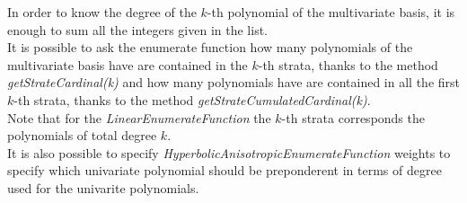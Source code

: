 In order to know the degree of the $k$-th polynomial of the multivariate basis, it is enough to sum all the integers given in the list.\\
It is possible to ask the enumerate function how many polynomials of the multivariate basis have are contained in the $k$-th strata, thanks to the method {\itshape getStrateCardinal(k)} and how many polynomials have are contained in all the first $k$-th strata, thanks to the method {\itshape getStrateCumulatedCardinal(k)}.\\
Note that for the \textit{LinearEnumerateFunction} the $k$-th strata corresponds the polynomials of total degree $k$.\\
It is also possible to specify \textit{HyperbolicAnisotropicEnumerateFunction} weights to specify which univariate polynomial should be preponderent in terms of degree used for the univarite polynomials.\\

\vspace*{0.1cm}

